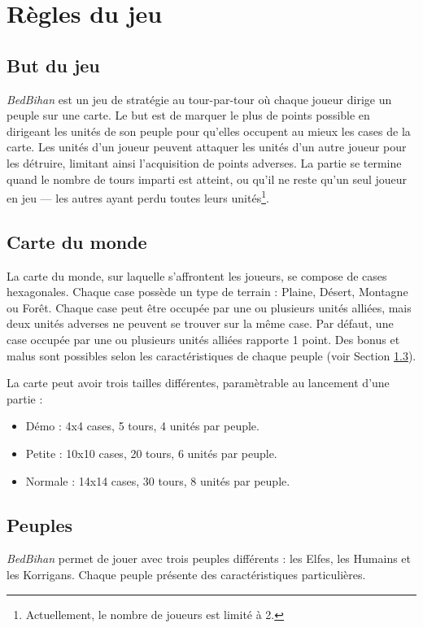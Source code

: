 \newpage
	\section{Règles du jeu}
	\label{sec:regles}

	\subsection{But du jeu}
	\label{subsec:butdujeu}
	\emph{BedBihan} est un jeu de stratégie au tour-par-tour où chaque joueur dirige un peuple sur une carte. Le but est de marquer le plus de points possible en dirigeant les unités de son peuple pour qu'elles occupent au mieux les cases de la carte. Les unités d’un joueur peuvent attaquer les unités d’un autre joueur pour les détruire, limitant ainsi l'acquisition de points adverses. La partie se termine quand le nombre de tours imparti est atteint, ou qu'il ne reste qu'un seul joueur en jeu --- les autres ayant perdu toutes leurs unités\footnote{Actuellement, le nombre de joueurs est limité à 2.}.

	\subsection{Carte du monde}
	\label{subsec:carte}
	La carte du monde, sur laquelle s'affrontent les joueurs, se compose de cases hexagonales. Chaque case possède un type de terrain : Plaine,	Désert, Montagne ou Forêt. Chaque case peut être occupée par une ou plusieurs unités alliées, mais deux unités adverses ne peuvent se trouver sur la même case. Par défaut, une case occupée par une ou plusieurs unités alliées rapporte 1 point. Des bonus et malus sont possibles selon les caractéristiques de chaque peuple (voir Section \ref{subsec:peuples}). 
	
	La carte peut avoir trois tailles différentes, paramètrable au lancement d'une partie :
	\begin{itemize}
		\item Démo : 4x4 cases, 5 tours, 4 unités par peuple.
		\item Petite : 10x10 cases, 20 tours, 6 unités par peuple.
		\item Normale : 14x14 cases, 30 tours, 8 unités par peuple.
	\end{itemize}
	
	
	\subsection{Peuples}
	\label{subsec:peuples}
	\emph{BedBihan} permet de jouer avec trois peuples différents : les Elfes, les Humains et les Korrigans. Chaque peuple présente des caractéristiques particulières.
	
